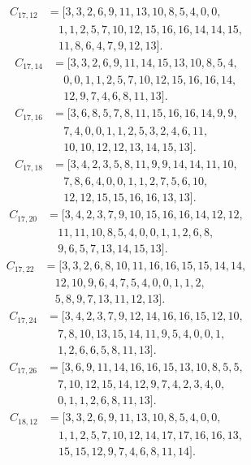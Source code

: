 \documentclass[11pt,a4paper]{article}
\theoremstyle{definition}\newtheorem{definition}[theorem]{Definition}
\theoremstyle{remark}\newtheorem{remark}[theorem]{Remark}
\begin{document}
\[\begin{aligned}
C_{17,12}&=[3,3,2,6,9,11,13,10,8,5,4,0,0,\\
&\quad 1,1,2,5,7,10,12,15,16,16,14,14,15,\\
&\quad 11,8,6,4,7,9,12,13].
\end{aligned}\]
\[\begin{aligned}
C_{17,14}&=[3,3,2,6,9,11,14,15,13,10,8,5,4,\\
&\quad 0,0,1,1,2,5,7,10,12,15,16,16,14,\\
&\quad 12,9,7,4,6,8,11,13].
\end{aligned}\]
\[\begin{aligned}
C_{17,16}&=[3,6,8,5,7,8,11,15,16,16,14,9,9,\\
&\quad 7,4,0,0,1,1,2,5,3,2,4,6,11,\\
&\quad 10,10,12,12,13,14,15,13].
\end{aligned}\]
\[\begin{aligned}
C_{17,18}&=[3,4,2,3,5,8,11,9,9,14,14,11,10,\\
&\quad 7,8,6,4,0,0,1,1,2,7,5,6,10,\\
&\quad 12,12,15,15,16,16,13,13].
\end{aligned}\]
\[\begin{aligned}
C_{17,20}&=[3,4,2,3,7,9,10,15,16,16,14,12,12,\\
&\quad 11,11,10,8,5,4,0,0,1,1,2,6,8,\\
&\quad 9,6,5,7,13,14,15,13].
\end{aligned}\]
\[\begin{aligned}
C_{17,22}&=[3,3,2,6,8,10,11,16,16,15,15,14,14,\\
&\quad 12,10,9,6,4,7,5,4,0,0,1,1,2,\\
&\quad 5,8,9,7,13,11,12,13].
\end{aligned}\]
\[\begin{aligned}
C_{17,24}&=[3,4,2,3,7,9,12,14,16,16,15,12,10,\\
&\quad 7,8,10,13,15,14,11,9,5,4,0,0,1,\\
&\quad 1,2,6,6,5,8,11,13].
\end{aligned}\]
\[\begin{aligned}
C_{17,26}&=[3,6,9,11,14,16,16,15,13,10,8,5,5,\\
&\quad 7,10,12,15,14,12,9,7,4,2,3,4,0,\\
&\quad 0,1,1,2,6,8,11,13].
\end{aligned}\]
\[\begin{aligned}
C_{18,12}&=[3,3,2,6,9,11,13,10,8,5,4,0,0,\\
&\quad 1,1,2,5,7,10,12,14,17,17,16,16,13,\\
&\quad 15,15,12,9,7,4,6,8,11,14].
\end{aligned}\]
\end{document}
